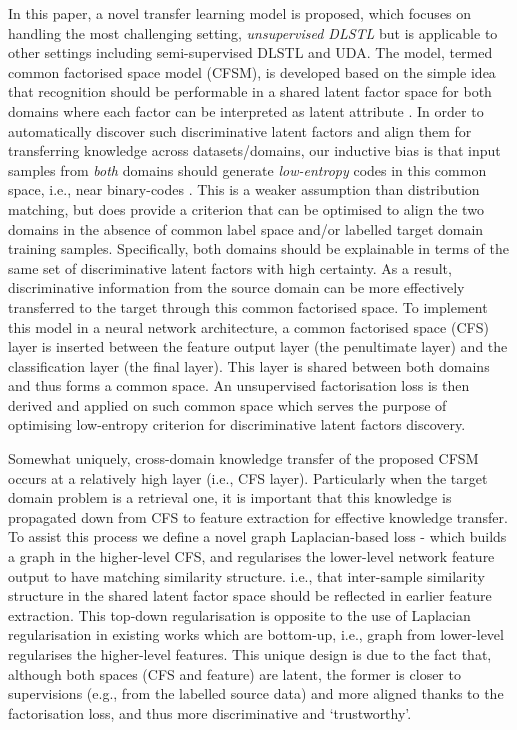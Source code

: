 \documentclass[letterpaper]{article} \usepackage{aaai19}  \usepackage{times}  \usepackage{helvet}  \usepackage{courier}  \usepackage{url}  \usepackage{graphicx}
\begin{document}
In this paper, a novel transfer learning model is proposed, which focuses on handling the most challenging setting, \emph{unsupervised DLSTL} but is applicable to other settings including  semi-supervised DLSTL and UDA.
The model, termed common factorised space model (CFSM), is 
developed based on the simple idea that recognition should be performable in a shared latent factor space for both domains where each factor can be interpreted as latent attribute \cite{fu2013latentAttrib,farhadi2012attributeDiscovery}.
In order to automatically discover such discriminative latent factors and align them for transferring knowledge across datasets/domains, 
our inductive bias is that input samples from \emph{both} domains should generate \emph{low-entropy} codes in this common space, i.e., near binary-codes \cite{salakhutdinov2009semantic,zhu2016deep}. This is a weaker assumption than distribution matching, but  does provide a criterion that can be optimised to align the two domains in the absence of common label space and/or labelled target domain training samples. Specifically, both domains should be explainable in terms of the same set of discriminative latent factors with high certainty.
As a result, discriminative information from the source domain can be more effectively transferred to the target through this common factorised space. 
To implement this model in a neural network architecture, a common factorised space (CFS) layer is inserted between the feature output layer (the penultimate layer) and the classification layer (the final layer). This layer is shared between both domains and thus forms a common space.
An unsupervised factorisation loss is then derived and applied on such common space which serves the purpose of optimising low-entropy criterion for discriminative latent factors discovery.




Somewhat uniquely, cross-domain knowledge transfer of the proposed CFSM occurs at a relatively high layer (i.e., CFS layer). Particularly when the target domain problem is a retrieval one, it is important that this knowledge is propagated down from CFS to feature extraction for effective knowledge transfer. To assist this process we define a novel graph Laplacian-based loss - which builds a graph in the higher-level CFS, and regularises the lower-level network feature output to have matching similarity structure. i.e., that inter-sample similarity structure in the shared latent factor space should be reflected in earlier feature extraction. This top-down regularisation is opposite to the use of Laplacian regularisation in existing works \cite{belkin2006laprlsSSL,yang2017graph} which are bottom-up, i.e., graph from lower-level regularises the higher-level features. This unique design is due to the fact that, although both spaces (CFS and feature) are latent, the former is closer to supervisions (e.g., from the labelled source data) and more aligned thanks to the factorisation loss, and thus more discriminative and `trustworthy'. 
\end{document}
